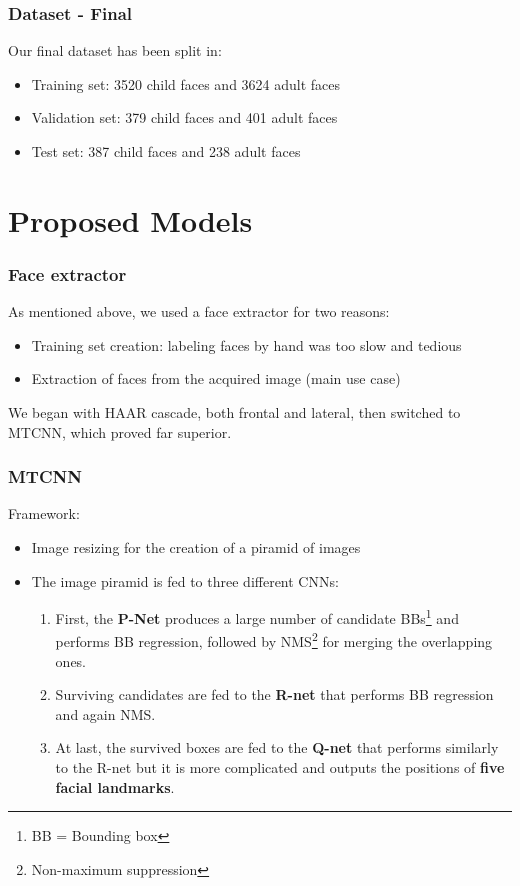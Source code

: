 \documentclass{beamer}
\begin{document}
	\begin{frame}
		\frametitle{Dataset - Final}
		Our final dataset has been split in:		
		\begin{itemize}
			\item Training set: 3520 child faces and 3624 adult faces
			\item Validation set: 379 child faces and 401 adult faces
			\item Test set: 387 child faces and 238 adult faces
		\end{itemize}
	\end{frame}

	\section{Proposed Models}
	
	\begin{frame}
		\frametitle{Face extractor}
		As mentioned above, we used a face extractor for two reasons:
		\begin{itemize}
			\item Training set creation: labeling faces by hand was too slow and tedious
			\item Extraction of faces from the acquired image (main use case)
		\end{itemize}
		We began with HAAR cascade, both frontal and lateral, then switched to MTCNN, which proved far superior.
	\end{frame}
	
	\begin{frame}
		\frametitle{MTCNN}
		Framework:
		\begin{itemize}
			\item Image resizing for the creation of a piramid of images
			\item The image piramid is fed to three different CNNs:
			\begin{enumerate}
				\item First, the \textbf{P-Net} produces a large number of candidate BBs\footnote{BB = Bounding box} and performs BB regression, followed by NMS\footnote{Non-maximum suppression} for merging the overlapping ones.
				\item Surviving candidates are fed to the \textbf{R-net} that performs BB regression and again NMS.
				\item At last, the survived boxes are fed to the \textbf{Q-net} that performs similarly to the R-net but it is more complicated and outputs the positions of \textbf{five facial landmarks}.
			\end{enumerate}
		\end{itemize}
	\end{frame}
	
\end{document}
